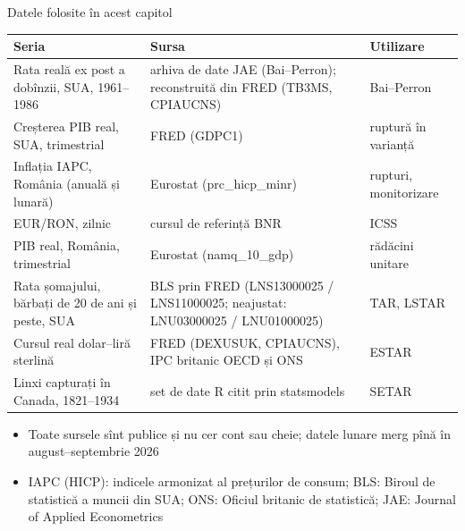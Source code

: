 \begin{frame}{Datele folosite în acest capitol}
\itemsize{\footnotesize}
\begin{center}
\scriptsize
\begin{tabular}{>{\raggedright\arraybackslash}p{4.6cm}>{\raggedright\arraybackslash}p{4.6cm}>{\raggedright\arraybackslash}p{2.4cm}}
\toprule
\textbf{Seria} & \textbf{Sursa} & \textbf{Utilizare} \\
\midrule
Rata reală ex post a dobînzii, SUA, 1961--1986 & arhiva de date JAE (Bai--Perron); reconstruită din FRED (TB3MS, CPIAUCNS) & Bai--Perron \\
Creșterea PIB real, SUA, trimestrial & FRED (GDPC1) & ruptură în varianță \\
Inflația IAPC, România (anuală și lunară) & Eurostat (prc\_hicp\_minr) & rupturi, monitorizare \\
EUR/RON, zilnic & cursul de referință BNR & ICSS \\
PIB real, România, trimestrial & Eurostat (namq\_10\_gdp) & rădăcini unitare \\
Rata șomajului, bărbați de 20 de ani și peste, SUA & BLS prin FRED (LNS13000025 / LNS11000025; neajustat: LNU03000025 / LNU01000025) & TAR, LSTAR \\
Cursul real dolar--liră sterlină & FRED (DEXUSUK, CPIAUCNS), IPC britanic OECD și ONS & ESTAR \\
Linxi capturați în Canada, 1821--1934 & set de date R citit prin statsmodels & SETAR \\
\bottomrule
\end{tabular}
\end{center}
\begin{itemize}
    \item Toate sursele sînt publice și nu cer cont sau cheie; datele lunare merg pînă în august--septembrie 2026
    \item IAPC (HICP): indicele armonizat al prețurilor de consum; BLS: Biroul de statistică a muncii din SUA; ONS: Oficiul britanic de statistică; JAE: Journal of Applied Econometrics
\end{itemize}
\end{frame}

